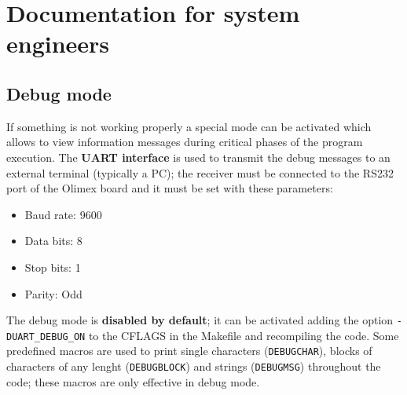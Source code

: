 \section{Documentation for system engineers}

\subsection{Debug mode}
If something is not working properly a special mode can be activated which allows to view information messages during critical phases of the program execution. The \textbf{UART interface} is used to transmit the debug messages to an external terminal (typically a PC); the receiver must be connected to the RS232 port of the Olimex board and it must be set with these parameters:
\begin{itemize}
	\item Baud rate: 9600
	\item Data bits: 8
	\item Stop bits: 1
	\item Parity: Odd
\end{itemize}
The debug mode is \textbf{disabled by default}; it can be activated adding the option \texttt{-DUART\_DEBUG\_ON} to the CFLAGS in the Makefile and recompiling the code. Some predefined macros are used to print single characters (\texttt{DEBUGCHAR}), blocks of characters of any lenght (\texttt{DEBUGBLOCK}) and strings (\texttt{DEBUGMSG}) throughout the code; these macros are only effective in debug mode.